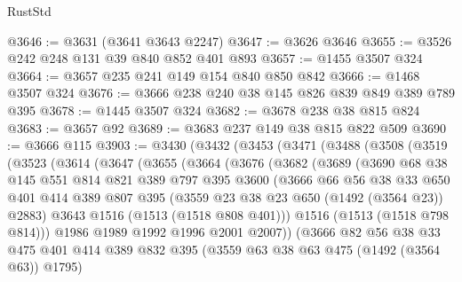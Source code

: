 \begin{lexlean}{RustStd}
\begin{coremodule}
{\begin{coremodule}
{{{{{{{{@3646 := @3631 (@3641 @3643 @2247)
@3647 := @3626 @3646
@3655 := @3526 @242 @248 @131 @39 @840 @852 @401 @893
@3657 := @1455 @3507 @324
@3664 := @3657 @235 @241 @149 @154 @840 @850 @842
@3666 := @1468 @3507 @324
@3676 := @3666 @238 @240 @38 @145 @826 @839 @849 @389 @789 @395
@3678 := @1445 @3507 @324
@3682 := @3678 @238 @38 @815 @824
@3683 := @3657 @92
@3689 := @3683 @237 @149 @38 @815 @822 @509
@3690 := @3666 @115
@3903 := @3430
    (@3432
      (@3453
        (@3471
          (@3488
            (@3508
              (@3519
                (@3523
                  (@3614
                    (@3647
                      (@3655
                        (@3664
                          (@3676
                            (@3682
                              (@3689
                                (@3690
                                  @68
                                  @38
                                  @145
                                  @551
                                  @814
                                  @821
                                  @389
                                  @797
                                  @395
                                  @3600
                                  (@3666
                                    @66
                                    @56
                                    @38
                                    @33
                                    @650
                                    @401
                                    @414
                                    @389
                                    @807
                                    @395
                                    (@3559 @23 @38 @23 @650 (@1492 (@3564 @23)) @2883)
                                    @3643
                                    @1516
                                    (@1513 (@1518 @808 @401)))
                                  @1516
                                  (@1513 (@1518 @798 @814)))
                                @1986
                                @1989
                                @1992
                                @1996
                                @2001
                                @2007))
                            (@3666
                              @82
                              @56
                              @38
                              @33
                              @475
                              @401
                              @414
                              @389
                              @832
                              @395
                              (@3559 @63 @38 @63 @475 (@1492 (@3564 @63)) @1795)
}}}}}}}}
\end{coremodule}}
\end{coremodule}
\end{lexlean}
